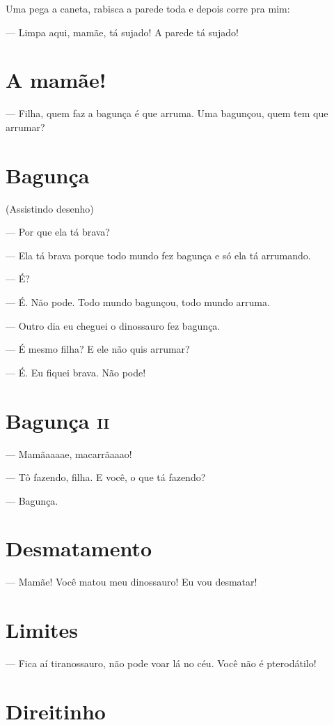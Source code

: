 {Uma pega a caneta, rabisca a parede toda e depois corre pra mim:

— Limpa aqui, mamãe, tá sujado! A parede tá sujado!

\chapter{A mamãe!}

— Filha, quem faz a bagunça é que arruma. Uma bagunçou, quem tem que
arrumar?

\chapter{Bagunça}

(Assistindo desenho)

— Por que ela tá brava?

— Ela tá brava porque todo mundo fez bagunça e só ela tá arrumando.

— É?

— É. Não pode. Todo mundo bagunçou, todo mundo arruma.

— Outro dia eu cheguei o dinossauro fez bagunça.

— É mesmo filha? E ele não quis arrumar?

— É. Eu fiquei brava. Não pode!

\chapter{Bagunça \textsc{ii}}

— Mamãaaaae, macarrãaaao!

— Tô fazendo, filha. E você, o que tá fazendo?

— Bagunça.

\chapter{Desmatamento}

— Mamãe! Você matou meu dinossauro! Eu vou desmatar!

\chapter{Limites}

— Fica aí tiranossauro, não pode voar lá no céu. Você não é pterodátilo!

\chapter{Direitinho}

}
